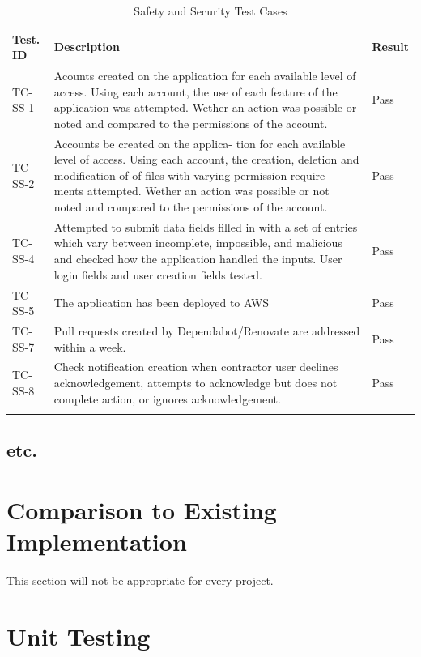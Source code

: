 \documentclass[12pt, titlepage]{article}
\begin{document}
\begin{longtable}{|m{1.75cm}|m{7cm}|m{3.25cm}|}
  \hline
  \textbf{Test. ID} & \textbf{Description} &
  \textbf{Result} \\
  \hline
  TC-SS-1 & Acounts created on the application
  for each available level of access. Using each account, the use of each
  feature of the application was attempted. Wether an action was
  possible or noted and compared to the permissions of the
  account. & Pass\\ \hline
  TC-SS-2 & Accounts be created on the applica-
  tion for each available level of access. Using each account, the creation,
  deletion and modification of of files with varying permission require-
  ments attempted. Wether an action was possible or
  not noted and compared to the permissions of the account. & Pass \\ \hline
  TC-SS-4 & Attempted to submit data fields filled in
  with a set of entries which vary between incomplete, impossible, and
  malicious and checked how the application handled the inputs. User
  login fields and user creation fields tested. & Pass\\ \hline
  TC-SS-5 & The application has been deployed to AWS & Pass\\ \hline
  TC-SS-7 & Pull requests created by Dependabot/Renovate are
  addressed within a week. & Pass\\ \hline
  TC-SS-8 & Check notification creation when contractor user declines
  acknowledgement, attempts to acknowledge but does not complete
  action, or ignores acknowledgement. & Pass\\ \hline
  \caption{Safety and Security Test Cases}
\end{longtable}

\subsection{etc.}

\section{Comparison to Existing Implementation}

This section will not be appropriate for every project.

\section{Unit Testing}
\end{document}
